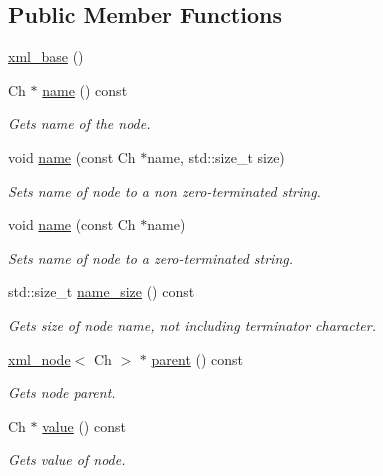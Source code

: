 \subsection*{Public Member Functions}
\begin{DoxyCompactItemize}
\item 
\mbox{\hyperlink{classrapidxml_1_1xml__base_a23630d2c130a9e0e3f3afa7584a9b218}{xml\+\_\+base}} ()
\item 
Ch $\ast$ \mbox{\hyperlink{classrapidxml_1_1xml__base_af8436e9ee14c127220113eaa956eafee}{name}} () const
\begin{DoxyCompactList}\small\item\em Gets name of the node. \end{DoxyCompactList}\item 
void \mbox{\hyperlink{classrapidxml_1_1xml__base_a4e7e23d06d48126c65b1f6266acfba5c}{name}} (const Ch $\ast$name, std\+::size\+\_\+t size)
\begin{DoxyCompactList}\small\item\em Sets name of node to a non zero-\/terminated string. \end{DoxyCompactList}\item 
void \mbox{\hyperlink{classrapidxml_1_1xml__base_ae099c291e104a0d277307fe71f5e0f9e}{name}} (const Ch $\ast$name)
\begin{DoxyCompactList}\small\item\em Sets name of node to a zero-\/terminated string. \end{DoxyCompactList}\item 
std\+::size\+\_\+t \mbox{\hyperlink{classrapidxml_1_1xml__base_ad01e2eff02202b130baad012d1ed7328}{name\+\_\+size}} () const
\begin{DoxyCompactList}\small\item\em Gets size of node name, not including terminator character. \end{DoxyCompactList}\item 
\mbox{\hyperlink{classrapidxml_1_1xml__node}{xml\+\_\+node}}$<$ Ch $>$ $\ast$ \mbox{\hyperlink{classrapidxml_1_1xml__base_a7f177e162f72f65ea1f0f0188e41c1ba}{parent}} () const
\begin{DoxyCompactList}\small\item\em Gets node parent. \end{DoxyCompactList}\item 
Ch $\ast$ \mbox{\hyperlink{classrapidxml_1_1xml__base_a558b1045e6751e4024309d41bf35c542}{value}} () const
\begin{DoxyCompactList}\small\item\em Gets value of node. \end{DoxyCompactList}\item 

\end{DoxyCompactItemize}
